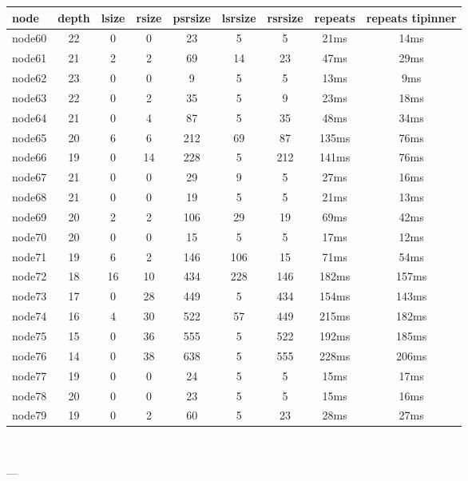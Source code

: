 \begin{tabular}{|l|c|c|c|c|c|c|c|c|}
\hline node & depth & lsize & rsize & psrsize & lsrsize & rsrsize   & repeats & repeats tipinner\\
    \hline node60 & 22 & 0 & 0 & 23 & 5 & 5 & 21ms & 14ms\\
    \hline node61 & 21 & 2 & 2 & 69 & 14 & 23 & 47ms & 29ms\\
    \hline node62 & 23 & 0 & 0 & 9 & 5 & 5 & 13ms & 9ms\\
    \hline node63 & 22 & 0 & 2 & 35 & 5 & 9 & 23ms & 18ms\\
    \hline node64 & 21 & 0 & 4 & 87 & 5 & 35 & 48ms & 34ms\\
    \hline node65 & 20 & 6 & 6 & 212 & 69 & 87 & 135ms & 76ms\\
    \hline node66 & 19 & 0 & 14 & 228 & 5 & 212 & 141ms & 76ms\\
    \hline node67 & 21 & 0 & 0 & 29 & 9 & 5 & 27ms & 16ms\\
    \hline node68 & 21 & 0 & 0 & 19 & 5 & 5 & 21ms & 13ms\\
    \hline node69 & 20 & 2 & 2 & 106 & 29 & 19 & 69ms & 42ms\\
    \hline node70 & 20 & 0 & 0 & 15 & 5 & 5 & 17ms & 12ms\\
    \hline node71 & 19 & 6 & 2 & 146 & 106 & 15 & 71ms & 54ms\\
    \hline node72 & 18 & 16 & 10 & 434 & 228 & 146 & 182ms & 157ms\\
    \hline node73 & 17 & 0 & 28 & 449 & 5 & 434 & 154ms & 143ms\\
    \hline node74 & 16 & 4 & 30 & 522 & 57 & 449 & 215ms & 182ms\\
    \hline node75 & 15 & 0 & 36 & 555 & 5 & 522 & 192ms & 185ms\\
    \hline node76 & 14 & 0 & 38 & 638 & 5 & 555 & 228ms & 206ms\\
    \hline node77 & 19 & 0 & 0 & 24 & 5 & 5 & 15ms & 17ms\\
    \hline node78 & 20 & 0 & 0 & 23 & 5 & 5 & 15ms & 16ms\\
    \hline node79 & 19 & 0 & 2 & 60 & 5 & 23 & 28ms & 27ms\\

\hline
\end{tabular} \

---


